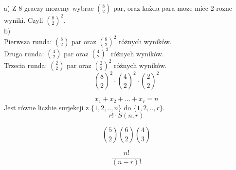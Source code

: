 \documentclass[fleqn]{article}
\begin{document}
\medskip

\medskip

a)
Z 8 graczy mozemy wybrac ${8 \choose 2}$ par, oraz każda para moze miec 2 rozne wyniki. Czyli ${ 8\choose 2}^2$.\\
b) \\
Pierwsza runda: ${8 \choose 2}$ par oraz ${ 8\choose 2}^2$ różnych wyników.\\
Druga runda: ${4 \choose 2}$ par oraz ${ 4\choose 2}^2$ różnych wyników. \\
Trzecia runda: ${2 \choose 2}$ par oraz ${ 2\choose 2}^2$ różnych wyników. \\
\[{ 8\choose 2}^2 \cdot { 4\choose 2}^2 \cdot { 2\choose 2}^2\]

\medskip

\medskip
\[x_1 + x_2 + ... + x_r = n \]
Jest równe liczbie surjekcji z $\big\{1, 2, .., n \big\}$ do $\big\{1, 2, .., r \big\}$. \\
\[r! \cdot S(n, r)\]
\medskip

\medskip
\[{5\choose 2} {6\choose 2} {4\choose 3}\]

\medskip
\[\frac{n!}{(n - r)!}\]
\medskip
\end{document}
